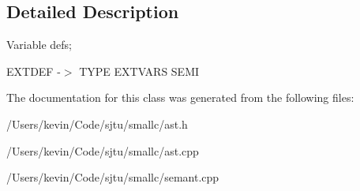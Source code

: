\subsection{Detailed Description}
Variable defs;

E\+X\+T\+D\+EF -\/$>$ T\+Y\+PE E\+X\+T\+V\+A\+RS S\+E\+MI 

The documentation for this class was generated from the following files\+:\begin{DoxyCompactItemize}
\item 
/\+Users/kevin/\+Code/sjtu/smallc/ast.\+h\item 
/\+Users/kevin/\+Code/sjtu/smallc/ast.\+cpp\item 
/\+Users/kevin/\+Code/sjtu/smallc/semant.\+cpp\end{DoxyCompactItemize}
